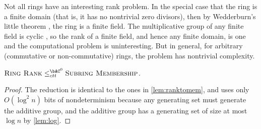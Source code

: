 \documentclass{article}
\begin{document}
Not all rings have an interesting rank problem.
In the special case that the ring is a finite domain (that is, it has no nontrivial zero divisors), then by Wedderburn's little theorem \autocite[Theorem~3~§~11.1]{nicholson12}, the ring is a finite field.
The multiplicative group of any finite field is cyclic \autocite[Theorem~7~§~6.4]{nicholson12}, so the rank of a finite field, and hence any finite domain, is one and the computational problem is uninteresting.
But in general, for arbitrary (commutative or non-commutative) rings, the problem has nontrivial complexity.

\begin{lemma}\label{lem:ringranktomem}
  $\textsc{Ring Rank} \leq_{ctt}^{\bAC^0} \textsc{Subring Membership}$.
\end{lemma}
\begin{proof}
  The reduction is identical to the ones in \autoref{lem:ranktomem}, and uses only $O(\log^2 n)$ bits of nondeterminism because any generating set must generate the additive group, and the additive group has a generating set of size at most $\log n$ by \autoref{lem:log}.
\end{proof}
\end{document}

